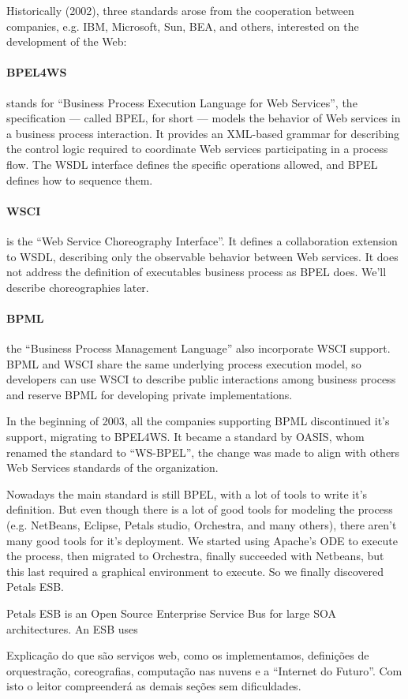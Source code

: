 Historically (2002), three standards arose from the cooperation between companies, e.g. IBM, Microsoft, Sun, BEA, and others, interested on the development of the Web:

\paragraph{BPEL4WS} 
stands for ``Business Process Execution Language for Web Services'', the specification — called BPEL, for short — models the behavior of Web services in a business process interaction. It provides an XML-based grammar for describing the control logic required to coordinate Web services participating in a process flow. The WSDL interface defines the specific operations allowed, and BPEL defines how to sequence them.

\paragraph{WSCI}
is the ``Web Service Choreography Interface''. It defines a collaboration extension to WSDL, describing only the observable behavior between Web services. It does not address the definition of executables business process as BPEL does. We'll describe choreographies later.

\paragraph{BPML} 
the ``Business Process Management Language'' also incorporate WSCI support. BPML and WSCI share the same underlying process execution model, so developers can use WSCI to describe public interactions among business process and reserve BPML for developing private implementations.

In the beginning of 2003, all the companies supporting BPML discontinued it's support, migrating to BPEL4WS. It became a standard by OASIS, whom renamed the standard to ``WS-BPEL'', the change was made to align with others Web Services standards of the organization. \citep{OASIS}

Nowadays the main standard is still BPEL, with a lot of tools to write it's definition. But even though there is a lot of good tools for modeling the process (e.g. NetBeans, Eclipse, Petals studio, Orchestra, and many others), there aren't many good tools for it's deployment. We started using Apache's ODE to execute the process, then migrated to Orchestra, finally succeeded with Netbeans, but this last required a graphical environment to execute. So we finally discovered Petals ESB. 

Petals ESB is an Open Source Enterprise Service Bus for large SOA architectures. \citep{PETALS} An ESB uses 





Explicação do que são serviços web, como os implementamos, definições de orquestração, coreografias, computação nas nuvens e a ``Internet do Futuro''. Com isto o leitor compreenderá as demais seções sem dificuldades.